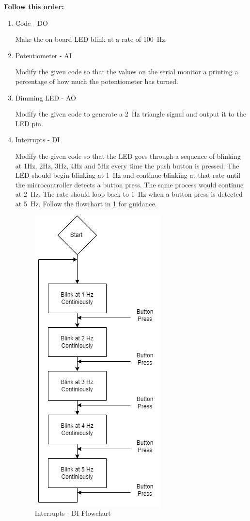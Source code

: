 \documentclass[12pt]{article}
\begin{document}
\bigskip
\textbf{Follow this order:}
\begin{enumerate}
\item Code - DO

Make the on-board LED blink at a rate of \SI{100}{\hertz}.

\item Potentiometer - AI

Modify the given code so that the values on the serial monitor a printing a percentage of how much the potentiometer has turned.

\item Dimming LED - AO

Modify the given code to generate a \SI{2}{\hertz} triangle signal and output it to the LED pin.

\item Interrupts - DI

Modify the given code so that the LED goes through a sequence of blinking at 1Hz, 2Hz, 3Hz, 4Hz and 5Hz every time the push button is pressed. The LED should begin blinking at \SI{1}{\hertz} and continue blinking at that rate until the microcontroller detects a button press. The same process would continue at \SI{2}{\hertz}. The rate should loop back to \SI{1}{\hertz} when a button press is detected at \SI{5}{\hertz}. Follow the flowchart in \ref{fig:interrupts_flowchart} for guidance. 

\begin{figure}
    \centering
    \includegraphics{Interrupts - DI.png}
    \caption{Interrupts - DI Flowchart}
    \label{fig:interrupts_flowchart}
\end{figure}


\end{enumerate}
\end{document}
